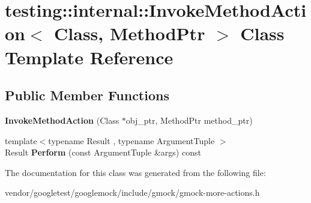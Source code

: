 \hypertarget{classtesting_1_1internal_1_1InvokeMethodAction}{}\section{testing\+:\+:internal\+:\+:Invoke\+Method\+Action$<$ Class, Method\+Ptr $>$ Class Template Reference}
\label{classtesting_1_1internal_1_1InvokeMethodAction}
\subsection*{Public Member Functions}
\begin{DoxyCompactItemize}
\item 
{\bfseries Invoke\+Method\+Action} (Class $\ast$obj\+\_\+ptr, Method\+Ptr method\+\_\+ptr)\hypertarget{classtesting_1_1internal_1_1InvokeMethodAction_a16e545f6166e2d54eeafdc2ab3adf06b}{}\label{classtesting_1_1internal_1_1InvokeMethodAction_a16e545f6166e2d54eeafdc2ab3adf06b}

\item 
{\footnotesize template$<$typename Result , typename Argument\+Tuple $>$ }\\Result {\bfseries Perform} (const Argument\+Tuple \&args) const \hypertarget{classtesting_1_1internal_1_1InvokeMethodAction_ad38f42621339fd3589227019610c21a5}{}\label{classtesting_1_1internal_1_1InvokeMethodAction_ad38f42621339fd3589227019610c21a5}

\end{DoxyCompactItemize}


The documentation for this class was generated from the following file\+:\begin{DoxyCompactItemize}
\item 
vendor/googletest/googlemock/include/gmock/gmock-\/more-\/actions.\+h\end{DoxyCompactItemize}
